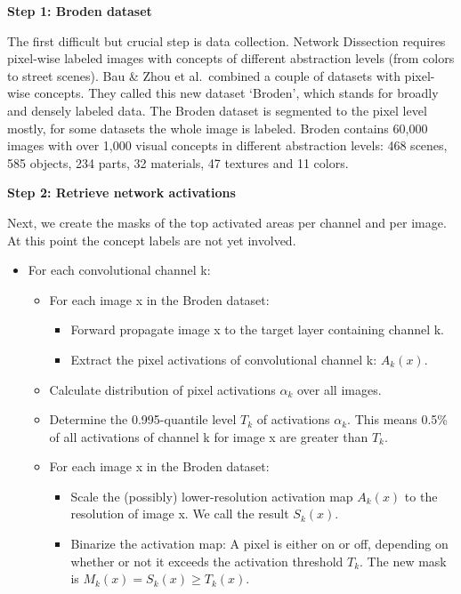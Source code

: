 \documentclass[
  11pt,
]{scrbook}
\providecommand{\tightlist}{%
  \setlength{\itemsep}{0pt}\setlength{\parskip}{0pt}}
\begin{document}
\textbf{Step 1: Broden dataset}

The first difficult but crucial step is data collection.
Network Dissection requires pixel-wise labeled images with concepts of different abstraction levels (from colors to street scenes).
Bau \& Zhou et al.~combined a couple of datasets with pixel-wise concepts.
They called this new dataset `Broden', which stands for broadly and densely labeled data.
The Broden dataset is segmented to the pixel level mostly, for some datasets the whole image is labeled.
Broden contains 60,000 images with over 1,000 visual concepts in different abstraction levels: 468 scenes, 585 objects, 234 parts, 32 materials, 47 textures and 11 colors.

\textbf{Step 2: Retrieve network activations}

Next, we create the masks of the top activated areas per channel and per image.
At this point the concept labels are not yet involved.

\begin{itemize}
\tightlist
\item
  For each convolutional channel k:

  \begin{itemize}
  \tightlist
  \item
    For each image x in the Broden dataset:

    \begin{itemize}
    \tightlist
    \item
      Forward propagate image x to the target layer containing channel k.
    \item
      Extract the pixel activations of convolutional channel k: \(A_k(x)\).
    \end{itemize}
  \item
    Calculate distribution of pixel activations \(\alpha_k\) over all images.
  \item
    Determine the 0.995-quantile level \(T_k\) of activations \(\alpha_k\). This means 0.5\% of all activations of channel k for image x are greater than \(T_k\).
  \item
    For each image x in the Broden dataset:

    \begin{itemize}
    \tightlist
    \item
      Scale the (possibly) lower-resolution activation map \(A_k(x)\) to the resolution of image x. We call the result \(S_k(x)\).
    \item
      Binarize the activation map: A pixel is either on or off, depending on whether or not it exceeds the activation threshold \(T_k\). The new mask is \(M_k(x)=S_k(x)\geq{}T_k(x)\).
    \end{itemize}
  \end{itemize}
\end{itemize}
\end{document}
